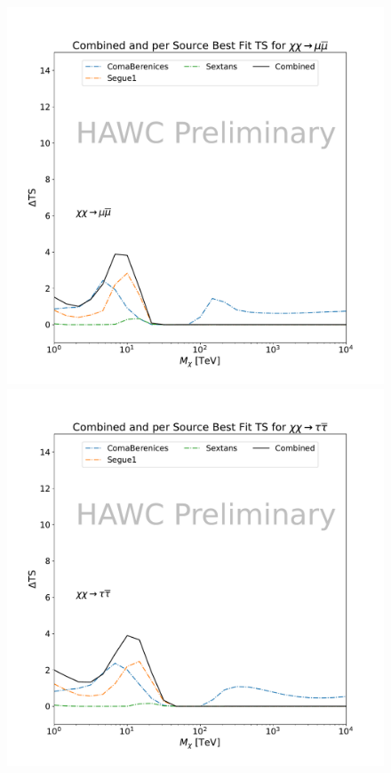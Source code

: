 \begin{figure}[h]
{    \includegraphics[scale=0.21]{figures/mtd_hawc_dm/results/CombinedTS_New_duck_mumu_.pdf}
    \includegraphics[scale=0.21]{figures/mtd_hawc_dm/results/CombinedTS_New_duck_tautau_.pdf}
}
\end{figure}
